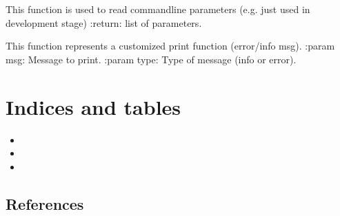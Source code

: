 \documentclass[letterpaper,10pt,english,openany,oneside]{sphinxmanual}
\begin{document}

\begin{fulllineitems}
\label{\detokenize{Utils:sbd.utils.getCommandLineParams}}
This function is used to read commandline parameters (e.g. just used in development stage)
:return: list of parameters.

\end{fulllineitems}


\begin{fulllineitems}
\label{\detokenize{Utils:sbd.utils.printCustom}}
This function represents a customized print function (error/info msg).
:param msg: Message to print.
:param type: Type of message (info or error).

\end{fulllineitems}



\chapter{Indices and tables}
\label{\detokenize{index:indices-and-tables}}\begin{itemize}
\item {} 

\item {} 

\item {} 

\end{itemize}


\section{References}
\label{\detokenize{index:references}}

\renewcommand{\indexname}{Python Module Index}
\begin{sphinxtheindex}
\let\bigletter\sphinxstyleindexlettergroup
\bigletter{s}
\item\relax{}
\end{sphinxtheindex}

\renewcommand{\indexname}{Index}
\printindex
\end{document}
